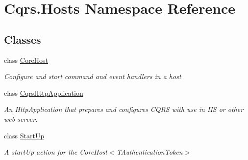 \hypertarget{namespaceCqrs_1_1Hosts}{}\section{Cqrs.\+Hosts Namespace Reference}
\label{namespaceCqrs_1_1Hosts}
\subsection*{Classes}
\begin{DoxyCompactItemize}
\item 
class \hyperlink{classCqrs_1_1Hosts_1_1CoreHost}{Core\+Host}
\begin{DoxyCompactList}\small\item\em Configure and start command and event handlers in a host \end{DoxyCompactList}\item 
class \hyperlink{classCqrs_1_1Hosts_1_1CqrsHttpApplication}{Cqrs\+Http\+Application}
\begin{DoxyCompactList}\small\item\em An Http\+Application that prepares and configures C\+Q\+RS with use in I\+IS or other web server. \end{DoxyCompactList}\item 
class \hyperlink{classCqrs_1_1Hosts_1_1StartUp}{Start\+Up}
\begin{DoxyCompactList}\small\item\em A start\+Up action for the Core\+Host$<$\+T\+Authentication\+Token$>$ \end{DoxyCompactList}\end{DoxyCompactItemize}
